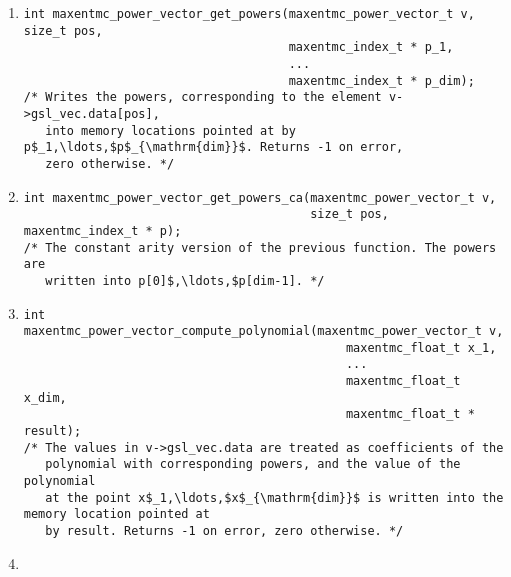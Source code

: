 \documentclass[12pt]{amsart}
\numberwithin{equation}{section}
\begin{document}
\begin{enumerate}[1.]
\begin{verbatim}
int maxentmc_power_vector_find_element_ca(maxentmc_power_vector_t v,
                                          maxentmc_index_t * p,
                                          size_t * pos);
/* The constant arity version of the previous function. The powers are
   specified in p[0]$,\ldots,$p[dim-1]. */
\end{verbatim}
\item \begin{verbatim}
int maxentmc_power_vector_get_powers(maxentmc_power_vector_t v, size_t pos,
                                     maxentmc_index_t * p_1,
                                     ...
                                     maxentmc_index_t * p_dim);
/* Writes the powers, corresponding to the element v->gsl_vec.data[pos],
   into memory locations pointed at by p$_1,\ldots,$p$_{\mathrm{dim}}$. Returns -1 on error,
   zero otherwise. */
\end{verbatim}
\item \begin{verbatim}
int maxentmc_power_vector_get_powers_ca(maxentmc_power_vector_t v,
                                        size_t pos, maxentmc_index_t * p);
/* The constant arity version of the previous function. The powers are
   written into p[0]$,\ldots,$p[dim-1]. */
\end{verbatim}
\item \begin{verbatim}
int maxentmc_power_vector_compute_polynomial(maxentmc_power_vector_t v,
                                             maxentmc_float_t x_1,
                                             ...
                                             maxentmc_float_t x_dim,
                                             maxentmc_float_t * result);
/* The values in v->gsl_vec.data are treated as coefficients of the
   polynomial with corresponding powers, and the value of the polynomial
   at the point x$_1,\ldots,$x$_{\mathrm{dim}}$ is written into the memory location pointed at
   by result. Returns -1 on error, zero otherwise. */
\end{verbatim}
\item \begin{verbatim}

\end{verbatim}
\end{enumerate}
\end{document}
